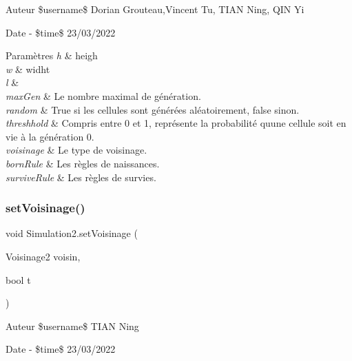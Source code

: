 \begin{DoxyAuthor}{Auteur}
\$username\$ Dorian Grouteau,Vincent Tu, T\+I\+AN Ning, Q\+IN Yi 
\end{DoxyAuthor}
\begin{DoxyDate}{Date}
-\/ \$time\$ 23/03/2022 
\begin{DoxyParams}{Paramètres}
{\em h} & heigh\\
\hline
{\em w} & widht\\
\hline
{\em l} & \\
\hline
{\em max\+Gen} & Le nombre maximal de génération.\\
\hline
{\em random} & True si les cellules sont générées aléatoirement, false sinon.\\
\hline
{\em threshhold} & Compris entre 0 et 1, représente la probabilité qu\textquotesingle{}une cellule soit en vie à la génération 0.\\
\hline
{\em voisinage} & Le type de voisinage.\\
\hline
{\em born\+Rule} & Les règles de naissances.\\
\hline
{\em survive\+Rule} & Les règles de survies.\\
\hline
\end{DoxyParams}

\end{DoxyDate}
\mbox{\label{class_simulation2_a38cbad0a856c0163b19960e72842363d}} 
\subsubsection{\texorpdfstring{set\+Voisinage()}{setVoisinage()}}
{\footnotesize\ttfamily void Simulation2.\+set\+Voisinage (\begin{DoxyParamCaption}\item[{Voisinage2}]{voisin,  }\item[{bool}]{t }\end{DoxyParamCaption})\hspace{0.3cm}{\ttfamily [inline]}}





\begin{DoxyAuthor}{Auteur}
\$username\$ T\+I\+AN Ning 
\end{DoxyAuthor}
\begin{DoxyDate}{Date}
-\/ \$time\$ 23/03/2022
\end{DoxyDate}



